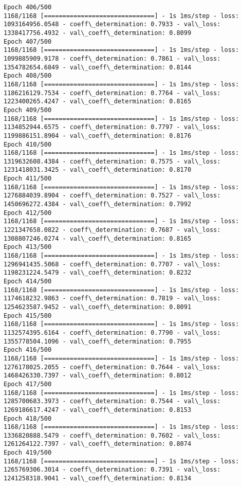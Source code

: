 \documentclass[11pt]{article}
\begin{document}
\begin{Verbatim}[commandchars=\\\{\}]
Epoch 406/500
1168/1168 [==============================] - 1s 1ms/step - loss: 1093164956.0548 - coeff\_determination: 0.7933 - val\_loss: 1338417756.4932 - val\_coeff\_determination: 0.8099
Epoch 407/500
1168/1168 [==============================] - 1s 1ms/step - loss: 1099885909.9178 - coeff\_determination: 0.7861 - val\_loss: 1354782654.6849 - val\_coeff\_determination: 0.8144
Epoch 408/500
1168/1168 [==============================] - 1s 1ms/step - loss: 1186216129.7534 - coeff\_determination: 0.7764 - val\_loss: 1223400265.4247 - val\_coeff\_determination: 0.8165
Epoch 409/500
1168/1168 [==============================] - 1s 1ms/step - loss: 1134852944.6575 - coeff\_determination: 0.7797 - val\_loss: 1199886151.8904 - val\_coeff\_determination: 0.8176
Epoch 410/500
1168/1168 [==============================] - 1s 1ms/step - loss: 1319632608.4384 - coeff\_determination: 0.7575 - val\_loss: 1231418031.3425 - val\_coeff\_determination: 0.8170
Epoch 411/500
1168/1168 [==============================] - 1s 1ms/step - loss: 1276884039.8904 - coeff\_determination: 0.7527 - val\_loss: 1450696272.4384 - val\_coeff\_determination: 0.7992
Epoch 412/500
1168/1168 [==============================] - 1s 1ms/step - loss: 1221347658.0822 - coeff\_determination: 0.7687 - val\_loss: 1308807246.0274 - val\_coeff\_determination: 0.8165
Epoch 413/500
1168/1168 [==============================] - 1s 1ms/step - loss: 1296941435.5068 - coeff\_determination: 0.7707 - val\_loss: 1198231224.5479 - val\_coeff\_determination: 0.8232
Epoch 414/500
1168/1168 [==============================] - 1s 1ms/step - loss: 1174618232.9863 - coeff\_determination: 0.7819 - val\_loss: 1254623587.9452 - val\_coeff\_determination: 0.8091
Epoch 415/500
1168/1168 [==============================] - 1s 1ms/step - loss: 1132574395.6164 - coeff\_determination: 0.7790 - val\_loss: 1355778504.1096 - val\_coeff\_determination: 0.7955
Epoch 416/500
1168/1168 [==============================] - 1s 1ms/step - loss: 1276178025.2055 - coeff\_determination: 0.7644 - val\_loss: 1468426330.7397 - val\_coeff\_determination: 0.8012
Epoch 417/500
1168/1168 [==============================] - 1s 1ms/step - loss: 1285700683.3973 - coeff\_determination: 0.7544 - val\_loss: 1269186617.4247 - val\_coeff\_determination: 0.8153
Epoch 418/500
1168/1168 [==============================] - 1s 1ms/step - loss: 1336820888.5479 - coeff\_determination: 0.7602 - val\_loss: 1261264122.7397 - val\_coeff\_determination: 0.8074
Epoch 419/500
1168/1168 [==============================] - 1s 1ms/step - loss: 1265769306.3014 - coeff\_determination: 0.7391 - val\_loss: 1241258318.9041 - val\_coeff\_determination: 0.8134

\end{Verbatim}
\end{document}
